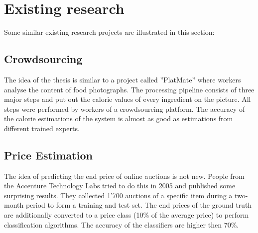 \documentclass[a4paper]{report}
\begin{document}
\section{Existing research}
Some similar existing research projects are illustrated in this section: 
\subsection{Crowdsourcing}
The idea of the thesis is similar to a project called ''PlatMate'' where workers analyse the content of food photographs. The processing pipeline consists of three major steps and put out the calorie values of every ingredient on the picture. All steps were performed by workers of a crowdsourcing platform. The accuracy of the calorie estimations of the system is almost as good as estimations from different trained experts. 
\subsection{Price Estimation}
The idea of predicting the end price of online auctions is not new. People from the Accenture Technology Labs tried to do this in 2005 and published some surprising results. They collected 1'700 auctions of a specific item during a two-month period to form a training and test set. The end prices of the ground truth are additionally converted to a price class (10\% of the average price) to perform classification algorithms. The accuracy of the classifiers are higher then 70\%.
\end{document}
